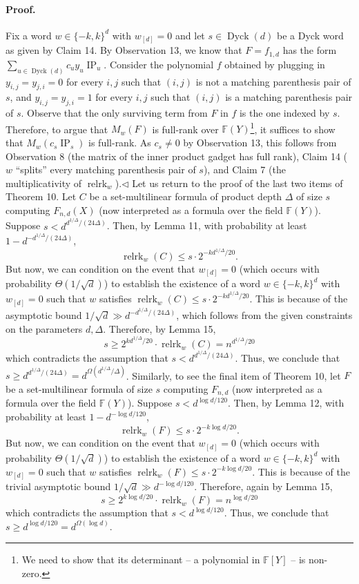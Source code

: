 \documentclass[10pt,a4paper]{article}
\begin{document}
\paragraph{Proof.} Fix a word $w\in\{-k,k\}^d$ with $w_{[d]}=0$ and let $s\in\operatorname{Dyck}(d)$ be a Dyck word as given by Claim 14. By Observation 13, we know that $F=f_{1,d}$ has the form $\sum_{u\in\operatorname{Dyck}(d)}c_u y_u\operatorname{IP}_u$. Consider the polynomial $f$ obtained by plugging in $y_{i,j}=y_{j,i}=0$ for every $i,j$ such that $(i,j)$ is not a matching parenthesis pair of $s$, and $y_{i,j}=y_{j,i}=1$ for every $i,j$ such that $(i,j)$ is a matching parenthesis pair of $s$. Observe that the only surviving term from $F$ in $f$ is the one indexed by $s$. Therefore, to argue that $M_w(F)$ is full-rank over $\mathbb F(Y)$\footnote{We need to show that its determinant -- a polynomial in $\mathbb F[Y]$ -- is non-zero.}, it suffices to show that $M_w(c_s\operatorname{IP}_s)$ is full-rank. As $c_s\neq0$ by Observation 13, this follows from Observation 8 (the matrix of the inner product gadget has full rank), Claim 14 ($w$ ``splits'' every matching parenthesis pair of $s$), and Claim 7 (the multiplicativity of $\operatorname{relrk}_w$).\hfill$\triangleleft$
Let us return to the proof of the last two items of Theorem 10. Let $C$ be a set-multilinear formula of product depth $\Delta$ of size $s$ computing $F_{n,d}(X)$ (now interpreted as a formula over the field $\mathbb F(Y)$). Suppose $s<d^{d^{1/\Delta}/(24\Delta)}$. Then, by Lemma 11, with probability at least $1-d^{-d^{1/\Delta}/(24\Delta)}$,
\[\operatorname{relrk}_w(C)\leq s\cdot2^{-kd^{1/\Delta}/20}.\]
But now, we can condition on the event that $w_{[d]}=0$ (which occurs with probability $\Theta(1/\sqrt d)$) to establish the existence of a word $w\in\{-k,k\}^d$ with $w_{[d]}=0$ such that $w$ satisfies $\operatorname{relrk}_w(C)\leq s\cdot2^{-kd^{1/\Delta}/20}$. This is because of the asymptotic bound $1/\sqrt d\gg d^{-d^{1/\Delta}/(24\Delta)}$, which follows from the given constraints on the parameters $d,\Delta$. Therefore, by Lemma 15,
\[s\geq2^{kd^{1/\Delta}/20}\cdot\operatorname{relrk}_w(C)=n^{d^{1/\Delta}/20}\]
which contradicts the assumption that $s<d^{d^{1/\Delta}/(24\Delta)}$. Thus, we conclude that $s\geq d^{d^{1/\Delta}/(24\Delta)}=d^{\Omega(d^{1/\Delta}/\Delta)}$.
Similarly, to see the final item of Theorem 10, let $F$ be a set-multilinear formula of size $s$ computing $F_{n,d}$ (now interpreted as a formula over the field $\mathbb F(Y)$). Suppose $s<d^{\log d/120}$. Then, by Lemma 12, with probability at least $1-d^{-\log d/120}$,
\[\operatorname{relrk}_w(F)\leq s\cdot2^{-k\log d/20}.\]
But now, we can condition on the event that $w_{[d]}=0$ (which occurs with probability $\Theta(1/\sqrt d)$) to establish the existence of a word $w\in\{-k,k\}^d$ with $w_{[d]}=0$ such that $w$ satisfies $\operatorname{relrk}_w(F)\leq s\cdot2^{-k\log d/20}$. This is because of the trivial asymptotic bound $1/\sqrt d\gg d^{-\log d/120}$. Therefore, again by Lemma 15,
\[s\geq2^{k\log d/20}\cdot\operatorname{relrk}_w(F)=n^{\log d/20}\]
which contradicts the assumption that $s<d^{\log d/120}$. Thus, we conclude that $s\geq d^{\log d/120}=d^{\Omega(\log d)}$.
\end{document}
